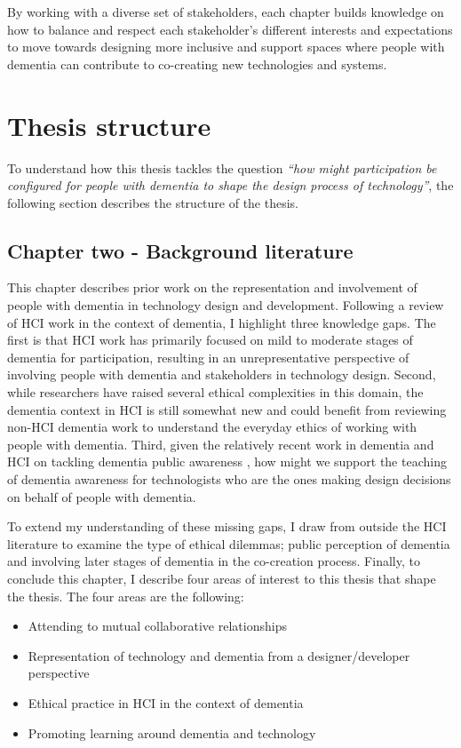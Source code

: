 By working with a diverse set of stakeholders, each chapter builds knowledge on how to balance and respect each stakeholder's different interests and expectations to move towards designing more inclusive and support spaces where people with dementia can contribute to co-creating new technologies and systems.

\section{Thesis structure}
\label{Intro: Thesis structure}
To understand how this thesis tackles the question \textit{``how might participation be configured for people with dementia to shape the design process of technology''}, the following section describes the structure of the thesis.

\subsection{Chapter two - Background literature}
\label{Intro:ChapterTwo}
This chapter describes prior work on the representation and involvement of people with dementia in technology design and development. Following a review of HCI work in the context of dementia, I highlight three knowledge gaps. The first is that HCI work has primarily focused on mild to moderate stages of dementia for participation, resulting in an unrepresentative perspective of involving people with dementia and stakeholders in technology design. Second, while researchers have raised several ethical complexities in this domain, the dementia context in HCI is still somewhat new and could benefit from reviewing non-HCI dementia work to understand the everyday ethics of working with people with dementia. Third, given the relatively recent work in dementia and HCI on tackling dementia public awareness \citep{lazar_safe_2019,talbot_how_2020}, how might we support the teaching of dementia awareness for technologists who are the ones making design decisions on behalf of people with dementia.  

To extend my understanding of these missing gaps, I draw from outside the HCI literature to examine the type of ethical dilemmas; public perception of dementia and involving later stages of dementia in the co-creation process. Finally, to conclude this chapter, I describe four areas of interest to this thesis that shape the thesis. The four areas are the following: 
\begin{itemize}
    \item Attending to mutual collaborative relationships
    \item Representation of technology and dementia from a designer/developer perspective
    \item Ethical practice in HCI in the context of dementia
    \item Promoting learning around dementia and technology
\end{itemize}


